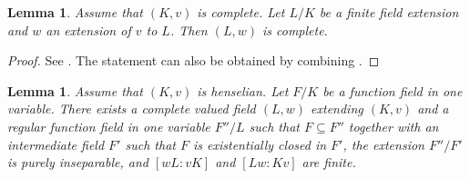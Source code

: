 \documentclass[12pt,leqno]{amsart}
\numberwithin{equation}{section}
\newtheorem{lem}[equation]{Lemma}
\theoremstyle{definition}
\theoremstyle{plain}
\begin{document}
\begin{lem}\label{L:complete-fin-ext}
Assume that $(K, v)$ is complete. Let $L/K$ be a finite field extension and $w$ an extension of $v$ to $L$.
Then $(L, w)$ is complete.
\end{lem}

\begin{proof}
See \cite[Cor.~6.24]{Kuhlmann}.
The statement can also be obtained by combining \cite[Theorem 4.15, Cor.~24.3 \& Theorem 24.10]{Warner}.
\end{proof}

\begin{lem}\label{L:HenselianToComplete}
Assume that $(K,v)$ is henselian. Let $F/K$ be a function field in one variable.
There exists a complete valued field $(L,w)$ extending $(K,v)$ and a regular function field in one variable $F''/L$ such that $F\subseteq F''$ 
together with an intermediate field $F'$ such that $F$ is existentially closed in $F'$, the extension $F''/F'$ is  purely inseparable, and $[wL : vK]$ and $[Lw:Kv]$ are finite.
\end{lem}
\end{document}
